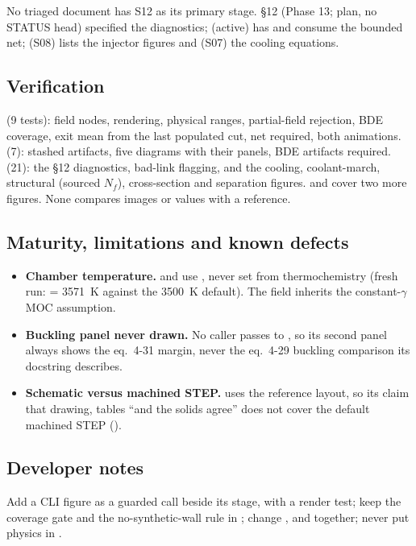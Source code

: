 No triaged document has S12 as its primary stage.  \S12 (Phase 13; plan, no STATUS head) specified the  diagnostics;  (active) has  and  consume the bounded net;  (S08) lists the injector figures and  (S07) the cooling equations.

\subsection{Verification}

 (9 tests): field nodes, rendering, physical ranges, partial-field rejection, BDE coverage, exit mean from the last populated cut, net required, both animations.  (7): stashed artifacts, five diagrams with their panels, BDE artifacts required.  (21): the \S12 diagnostics, bad-link flagging, and the cooling, coolant-march, structural (sourced $N_f$), cross-section and separation figures.  and  cover two more figures. None compares images or values with a reference.

\subsection{Maturity, limitations and known defects}

\begin{itemize}
\item \textbf{Chamber temperature.}  and  use , never set from thermochemistry (fresh run:  = 3571~K against the 3500~K default). The field inherits the constant-$\gamma$ MOC assumption.
\item \textbf{Buckling panel never drawn.} No caller passes  to , so its second panel always shows the eq.~4-31 margin, never the eq.~4-29 buckling comparison its docstring describes.
\item \textbf{Schematic versus machined STEP.}  uses the reference layout, so its claim that drawing, tables ``and the solids agree'' does not cover the default machined STEP ().
\end{itemize}

\subsection{Developer notes}

Add a CLI figure as a guarded call beside its stage, with a render test; keep the coverage gate and the no-synthetic-wall rule in ; change ,  and  together; never put physics in .
